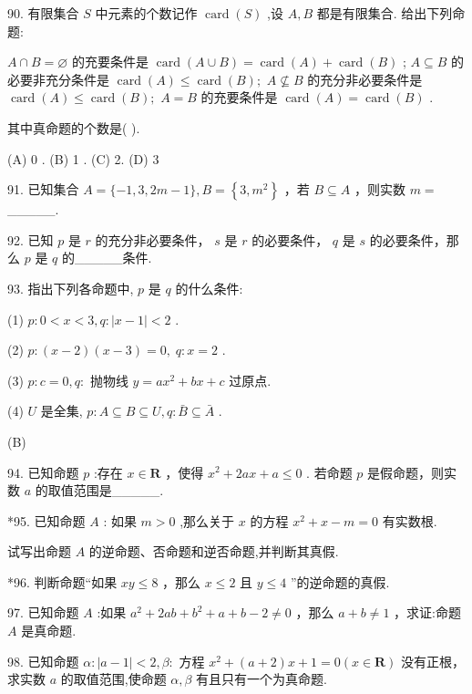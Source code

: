 \documentclass[10pt]{article}
\newcommand*\circled[1]{\tikz[baseline=(char.base)]{\node[shape=circle,draw,inner sep=1.5pt] (char) {\small #1};}}
\begin{document}
90. 有限集合 \(S\) 中元素的个数记作 \(\operatorname{card}\left( S\right)\) ,设 \(A,B\) 都是有限集合. 给出下列命题:

 \circled{1}  \(A \cap  B = \varnothing\) 的充要条件是 \(\operatorname{card}\left( {A \cup  B}\right)  = \operatorname{card}\left( A\right)  + \operatorname{card}\left( B\right)\) ;  \circled{2}  \(A \subseteq  B\) 的必要非充分条件是 \(\operatorname{card}\left( A\right)  \leq  \operatorname{card}\left( B\right) ;\)  \circled{3}  \(A \nsubseteq  B\) 的充分非必要条件是 \(\operatorname{card}\left( A\right)  \leq  \operatorname{card}\left( B\right) ;\)  \circled{4}  \(A = B\) 的充要条件是 \(\operatorname{card}\left( A\right)  = \operatorname{card}\left( B\right)\) .

其中真命题的个数是( ).

(A) 0 . (B) 1 . (C) 2. (D) 3

91. 已知集合 \(A = \{  - 1,3,{2m} - 1\} ,B = \left\{  {3,{m}^{2}}\right\}\) ，若 \(B \subseteq  A\) ，则实数 \(m =\) \_\_\_\_\_.

92. 已知 \(p\) 是 \(r\) 的充分非必要条件， \(s\) 是 \(r\) 的必要条件， \(q\) 是 \(s\) 的必要条件，那么 \(p\) 是 \(q\) 的\_\_\_\_\_条件.

93. 指出下列各命题中, \(p\) 是 \(q\) 的什么条件:

(1) \(p : 0 < x < 3,q : \left| {x - 1}\right|  < 2\) .

(2) \(p : \left( {x - 2}\right) \left( {x - 3}\right)  = 0,\;q : x = 2\) .

(3) \(p : c = 0,q :\) 抛物线 \(y = a{x}^{2} + {bx} + c\) 过原点.

(4) \(U\) 是全集, \(p : A \subseteq  B \subseteq  U,q : \bar{B} \subseteq  \bar{A}\) .

(B)

94. 已知命题 \(p\) :存在 \(x \in  \mathbf{R}\) ，使得 \({x}^{2} + {2ax} + a \leq  0\) . 若命题 \(p\) 是假命题，则实数 \(a\) 的取值范围是\_\_\_\_\_.

*95. 已知命题 \(A\) : 如果 \(m > 0\) ,那么关于 \(x\) 的方程 \({x}^{2} + x - m = 0\) 有实数根.

试写出命题 \(A\) 的逆命题、否命题和逆否命题,并判断其真假.

*96. 判断命题“如果 \({xy} \leq  8\) ，那么 \(x \leq  2\) 且 \(y \leq  4\) ”的逆命题的真假.

97. 已知命题 \(A\) :如果 \({a}^{2} + {2ab} + {b}^{2} + a + b - 2 \neq  0\) ，那么 \(a + b \neq  1\) ，求证:命题 \(A\) 是真命题.

98. 已知命题 \(\alpha  : \left| {a - 1}\right|  < 2,\beta  :\) 方程 \({x}^{2} + \left( {a + 2}\right) x + 1 = 0\left( {x \in  \mathbf{R}}\right)\) 没有正根，求实数 \(a\) 的取值范围,使命题 \(\alpha ,\beta\) 有且只有一个为真命题.
\end{document}
